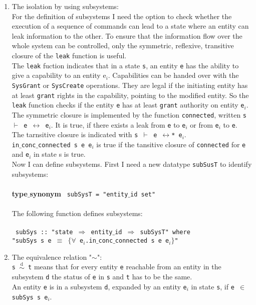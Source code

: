 \begin{enumerate}
\item The isolation by using subsystems: \\
For the definition of subsystems I need the option to check whether  the execution of a sequence of commands can lead to a state where an entity can leak information to the other. To ensure that the information flow over the whole system can be controlled, only the symmetric, reflexive, transitive closure of the \texttt{leak} function is useful. \\
The  \texttt{leak} fuction \cite{TakeG} indicates that in a state \texttt{s}, an entity \texttt{e} has the ability to give a capability to an entity e$_i$. Capabilities can be handed over with the \texttt{SysGrant} or \texttt{SysCreate} operations. They are legal if the initiating entity has at least \texttt{grant} rights in the capability, pointing to the modified entity. So the \texttt{leak} function checks if the entity \texttt{e} has at least \texttt{grant} authority on entity \texttt{e$_i$}. The symmetric closure is implemented by the function \texttt{connected}, written \texttt{s $\vdash$ e $\longleftrightarrow$ e$_i$}. It is true, if there exists a leak from \texttt{e} to \texttt{e$_i$} or from \texttt{e$_i$} to \texttt{e}. \\
The tarnsitive closure is indicated with \texttt{s $\vdash$ e $\longleftrightarrow$* e$_i$}. \\
\texttt{in$\_$conc$\_$connected s e e$_i$} is true  if the tansitive closure of \texttt{connected} for \texttt{e} and \texttt{e$_i$} in state s is true. \\ 
Now I can define subsystems. First I need a new datatype \texttt{subSusT} to identify subsystems: \\ \\
{\textbf{type$\_$synonym}
\texttt{
subSysT = "entity$\_$id set"}} \\ \\
The following function defines subsystems: \\ \\
{
\texttt{
subSys :: "state $\Rightarrow$ entity$\_$id $\Rightarrow$ subSysT" where \\ 
"subSys s e $\equiv$ $\{\forall$ e$_i$.in$\_$conc$\_$connected s e e$_i\}$"}} 
\item The equivalence relation "$\sim$": \\
\texttt{s $\overset{\text{d}}{\sim}$ t} means that for every entity \texttt{e} reachable from an entity in the subsystem \texttt{d} the status of \texttt{e} in \texttt{s} and \texttt{t} has to be the same. \\
An entity \texttt{e} is in a subsystem \texttt{d}, expanded by an entity \texttt{e$_i$} in state \texttt{s}, if \texttt{e $\in$ subSys s e$_i$}.


\end{enumerate}
